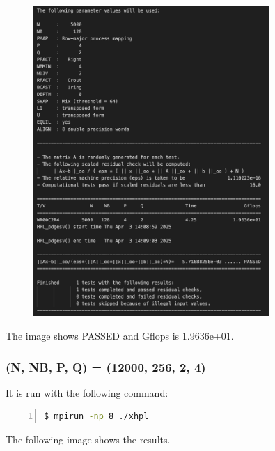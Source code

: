 \documentclass{article}
\begin{document}
\begin{figure}[htbp]
    \centering
    \includegraphics[width=0.8\textwidth]{./img/HPL_5000_128_4_2.png}
\end{figure}

The image shows PASSED and Gflops is 1.9636e+01.

\clearpage

\subsubsection*{(N, NB, P, Q) = (12000, 256, 2, 4)}

It is run with the following command:

\begin{lstlisting}[language=bash, basicstyle=\ttfamily\small, numbers=left, numberstyle=\tiny\color{gray}, stepnumber=1, frame=single]
$ mpirun -np 8 ./xhpl
\end{lstlisting}

The following image shows the results.
\end{document}
